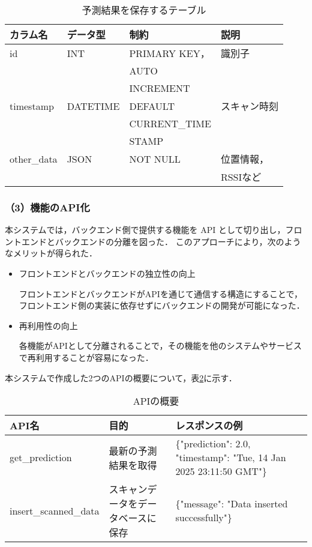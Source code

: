 \begin{table}[tb]
	\centering
	\caption{予測結果を保存するテーブル}
	\label{tbl:prediction_table}
	\small
	\setlength{\tabcolsep}{4pt}
	\doublerulesep=0.3pt
	\begin{tabular}{l|l|l|l} \hline\hline\hline
		カラム名 & データ型 & 制約 & 説明 \\ \hline
		id & INT & PRIMARY KEY， &  識別子 \\
		&&AUTO& \\
		&&INCREMENT& \\ \hline
		timestamp & DATETIME & DEFAULT  & スキャン時刻 \\
		&&CURRENT\_TIME& \\
		&&STAMP& \\ \hline
		other\_data & JSON & NOT NULL & 位置情報，\\
		&&&RSSIなど \\ \hline\hline\hline
	\end{tabular}
\end{table}

\subsubsection*{（3）機能のAPI化}
本システムでは，バックエンド側で提供する機能を API として切り出し，フロントエンドとバックエンドの分離を図った．
このアプローチにより，次のようなメリットが得られた．

\begin{itemize}
	\item フロントエンドとバックエンドの独立性の向上
	
	フロントエンドとバックエンドがAPIを通じて通信する構造にすることで，フロントエンド側の実装に依存せずにバックエンドの開発が可能になった．
	
	\item 再利用性の向上
	 
	各機能がAPIとして分離されることで，その機能を他のシステムやサービスで再利用することが容易になった．
	
\end{itemize}

本システムで作成した2つのAPIの概要について，表\ref{tbl:API1}に示す．

\begin{table}[tb]
	\centering
	\caption{APIの概要}
	\label{tbl:API1}
	\small
	\setlength{\tabcolsep}{3pt}
	\doublerulesep=0.3pt
    \begin{tabular}{l|p{2.6cm}|p{2.6cm}} \hline\hline\hline
		API名 & 目的 & レスポンスの例 \\ \hline
		get\_prediction & 最新の予測結果を取得 & \{"prediction": 2.0, "timestamp": "Tue, 14 Jan 2025 23:11:50 GMT"\} \\ \hline
		insert\_scanned\_data & スキャンデータをデータベースに保存 & \{"message": "Data inserted successfully"\} \\ \hline\hline\hline
	\end{tabular}
\end{table}